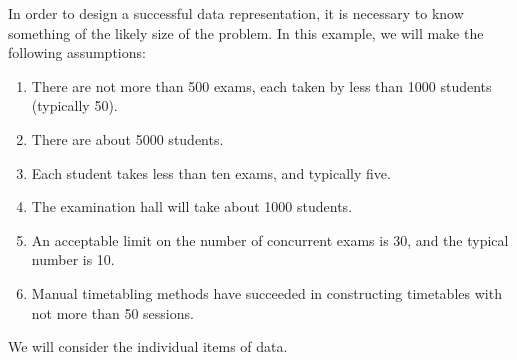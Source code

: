 In order to design a successful data representation, it is necessary to know
something of the likely size of the problem. In this example, we will make the
following assumptions:

\begin{enumerate}[wide, nosep, label=(\arabic*)]
	\item There are not more than 500 exams, each taken by less than 1000 students (typically 50).
	\item There are about 5000 students.
	\item Each student takes less than ten exams, and typically five.
	\item The examination hall will take about 1000 students.
	\item An acceptable limit on the number of concurrent exams is 30, and the typical number is 10.
	\item Manual timetabling methods have succeeded in constructing timetables with not more than 50 sessions.
\end{enumerate}

We will consider the individual items of data.

